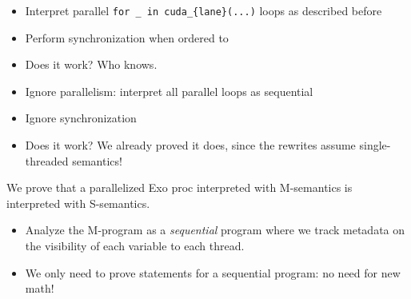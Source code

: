 \begin{minipage}[t]{0.5\textwidth}\fixminipage
{}
\begin{itemize}
  \item Interpret parallel \texttt{for \_ in cuda\_\{lane\}(...)} loops as described before
  \item Perform synchronization when ordered to
  \item Does it work? Who knows.
\end{itemize}
\begin{itemize}
  \item Ignore parallelism: interpret all parallel loops as sequential
  \item Ignore synchronization
  \item Does it work? We already proved it does, since the rewrites assume single-threaded semantics!
\end{itemize}
We prove that a parallelized Exo proc interpreted with M-semantics is  interpreted with S-semantics.
\begin{itemize}
  \item Analyze the M-program as a \textit{sequential} program where we track metadata on the visibility of each variable to each thread.
  \item We only need to prove statements for a sequential program: no need for new math!
\end{itemize}
\end{minipage}
\newpage
{}

